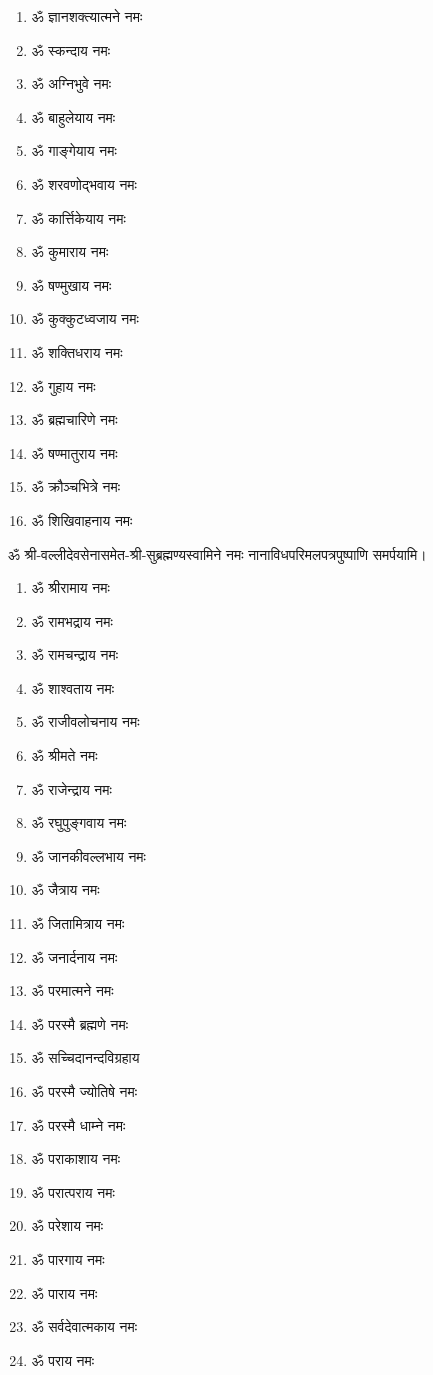 \begin{center}
\vspace{-1em}
\begin{multicols}{2}
\begin{enumerate}
\item ॐ ज्ञानशक्त्यात्मने नमः
\item ॐ स्कन्दाय नमः
\item ॐ अग्निभुवे नमः
\item ॐ बाहुलेयाय नमः
\item ॐ गाङ्गेयाय नमः
\item ॐ शरवणोद्भवाय नमः
\item ॐ कार्त्तिकेयाय नमः
\item ॐ कुमाराय नमः
\item ॐ षण्मुखाय नमः
\item ॐ कुक्कुटध्वजाय नमः
\item ॐ शक्तिधराय नमः
\item ॐ गुहाय नमः
\item ॐ ब्रह्मचारिणे नमः
\item ॐ षण्मातुराय नमः
\item ॐ क्रौञ्चभित्रे नमः
\item ॐ शिखिवाहनाय नमः
\end{enumerate}
\end{multicols}
\vspace{-1em}
ॐ श्री-वल्लीदेवसेनासमेत-श्री-सुब्रह्मण्यस्वामिने नमः नानाविधपरिमलपत्रपुष्पाणि समर्पयामि। \medskip


\begin{multicols}{2}
\begin{enumerate}
\item ॐ श्रीरामाय नमः
\item ॐ रामभद्राय नमः
\item ॐ रामचन्द्राय नमः
\item ॐ शाश्वताय नमः
\item ॐ राजीवलोचनाय नमः
\item ॐ श्रीमते नमः
\item ॐ राजेन्द्राय नमः
\item ॐ रघुपुङ्गवाय नमः
\item ॐ जानकीवल्लभाय नमः
\item ॐ जैत्राय नमः
\item ॐ जितामित्राय नमः
\item ॐ जनार्दनाय नमः
\item ॐ परमात्मने नमः
\item ॐ परस्मै ब्रह्मणे नमः
\item ॐ सच्चिदानन्दविग्रहाय
\item ॐ परस्मै ज्योतिषे नमः
\item ॐ परस्मै धाम्ने नमः
\item ॐ पराकाशाय नमः
\item ॐ परात्पराय नमः
\item ॐ परेशाय नमः
\item ॐ पारगाय नमः
\item ॐ पाराय नमः
\item ॐ सर्वदेवात्मकाय नमः
\item ॐ पराय नमः
\end{enumerate}
\end{multicols}


\end{center}
